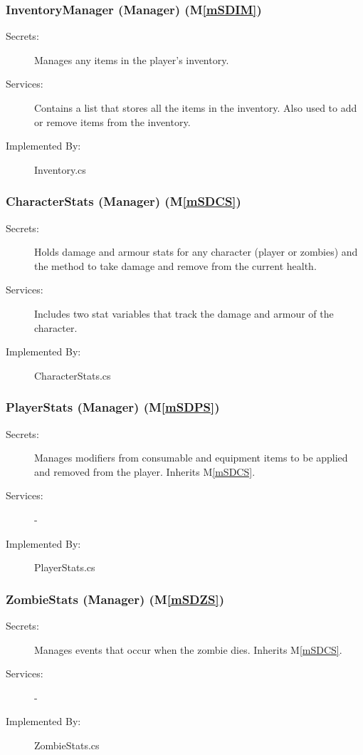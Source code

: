 \documentclass[12pt, titlepage]{article}
\newcommand{\mref}[1]{M\ref{#1}}
\begin{document}
\subsubsection{InventoryManager (Manager) (\mref{mSDIM})}

\begin{description}
\item[Secrets:] Manages any items in the player's inventory.
\item[Services:] Contains a list that stores all the items in the inventory. {\color {magenta} Also used to add or remove items from the inventory.}
\item[Implemented By:] Inventory.cs
\end{description}

\subsubsection{CharacterStats (Manager) (\mref{mSDCS})}

\begin{description}
\item[Secrets:] Holds damage and armour stats for any character (player or zombies) and the method to take damage and remove from the current health.
\item[Services:] Includes two stat variables that track the damage and armour of the character.
\item[Implemented By:] CharacterStats.cs
\end{description}

\subsubsection{PlayerStats (Manager) (\mref{mSDPS})}

\begin{description}
\item[Secrets:] Manages modifiers from consumable and equipment items to be applied and removed from the player. Inherits \mref{mSDCS}.
\item[Services:] -
\item[Implemented By:] PlayerStats.cs
\end{description}

\subsubsection{ZombieStats (Manager) (\mref{mSDZS})}

\begin{description}
\item[Secrets:] Manages events that occur when the zombie dies. Inherits \mref{mSDCS}.
\item[Services:] -
\item[Implemented By:] ZombieStats.cs
\end{description}
\end{document}
